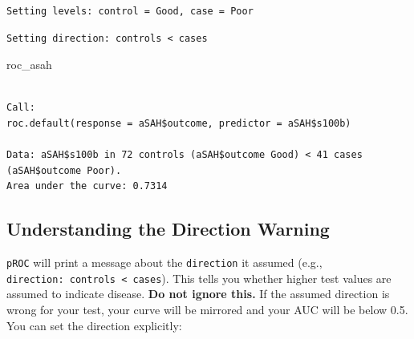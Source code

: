 \documentclass[
  letterpaper,
  DIV=11,
  numbers=noendperiod]{scrreprt}
\newenvironment{Shaded}{\begin{snugshade}}{\end{snugshade}}
\newcommand{\AttributeTok}[1]{\textcolor[rgb]{0.40,0.45,0.13}{#1}}
\newcommand{\CommentTok}[1]{\textcolor[rgb]{0.37,0.37,0.37}{#1}}
\newcommand{\FunctionTok}[1]{\textcolor[rgb]{0.28,0.35,0.67}{#1}}
\newcommand{\NormalTok}[1]{\textcolor[rgb]{0.00,0.23,0.31}{#1}}
\newcommand{\OtherTok}[1]{\textcolor[rgb]{0.00,0.23,0.31}{#1}}
\newcommand{\SpecialCharTok}[1]{\textcolor[rgb]{0.37,0.37,0.37}{#1}}
\newcommand{\StringTok}[1]{\textcolor[rgb]{0.13,0.47,0.30}{#1}}
\begin{document}
\begin{Shaded}
\end{Shaded}

\begin{verbatim}
Setting levels: control = Good, case = Poor
\end{verbatim}

\begin{verbatim}
Setting direction: controls < cases
\end{verbatim}

\begin{Shaded}
\begin{Highlighting}[]
\NormalTok{roc\_asah}
\end{Highlighting}
\end{Shaded}

\begin{verbatim}

Call:
roc.default(response = aSAH$outcome, predictor = aSAH$s100b)

Data: aSAH$s100b in 72 controls (aSAH$outcome Good) < 41 cases (aSAH$outcome Poor).
Area under the curve: 0.7314
\end{verbatim}

\subsection{Understanding the Direction
Warning}\label{understanding-the-direction-warning}

\texttt{pROC} will print a message about the \texttt{direction} it
assumed (e.g., \texttt{direction:\ controls\ \textless{}\ cases}). This
tells you whether higher test values are assumed to indicate disease.
\textbf{Do not ignore this.} If the assumed direction is wrong for your
test, your curve will be mirrored and your AUC will be below 0.5. You
can set the direction explicitly:

\begin{Shaded}
\end{Shaded}
\end{document}
